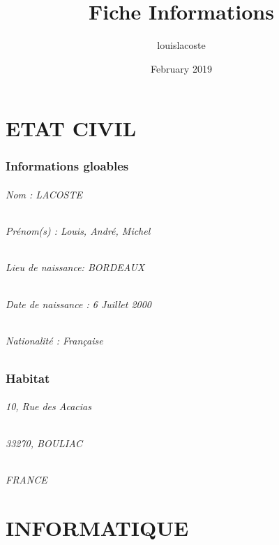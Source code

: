 \documentclass{article}
\title{Fiche Informations}
\author{louislacoste}
\date{February 2019}
\begin{document}
\maketitle

\clearpage

\part{ETAT CIVIL}

\section{Informations gloables}

\paragraph{Nom : LACOSTE}
\paragraph{Prénom(s) : Louis, André, Michel}
\paragraph{Lieu de naissance: BORDEAUX}
\paragraph{Date de naissance : 6 Juillet 2000}
\paragraph{Nationalité : Française}

\section{Habitat}

\paragraph{10, Rue des Acacias}
\paragraph{33270, BOULIAC}
\paragraph{FRANCE}

\clearpage
\part{INFORMATIQUE}
\setcounter{section}{0}
\end{document}
